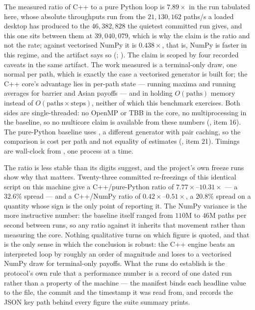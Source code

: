 \documentclass[11pt,a4paper]{article}
\begin{document}
The measured ratio of C++ to a pure Python loop is $7.89\times$ in the run tabulated
here, whose absolute throughputs run from the $21{,}130{,}162$ paths/s a loaded desktop has
produced to the $46{,}382{,}828$ the quietest committed run gives, and this one sits between them at
$39{,}040{,}079$, which is why the claim is the ratio and not the rate; against vectorised NumPy it
is $0.438\times$, that is, NumPy is faster in this regime, and the artifact says
so (;
). The claim is scoped by four recorded caveats in
the same artifact. The work measured is a terminal-only draw, one normal per path, which is exactly
the case a vectorised generator is built for; the C++ core's advantage lies in per-path state ---
running maxima and running averages for barrier and Asian payoffs --- and in holding
$O(\text{paths})$ memory instead of $O(\text{paths} \times \text{steps})$, neither of which this
benchmark exercises. Both sides are single-threaded: no OpenMP or TBB in the core, no
multiprocessing in the baseline, so no multicore claim is available from these numbers
(, item 16). The pure-Python baseline uses
, a different generator with pair caching, so the comparison is
cost per path and not equality of estimates (, item 21). Timings are
wall-clock from , one process at a time.

The ratio is less stable than its digits suggest, and the project's own freeze runs show why
that matters. Twenty-three committed re-freezings of this identical script on this machine give a
C++/pure-Python ratio of $7.77\times$--$10.31\times$ --- a $32.6\%$ spread --- and a C++/NumPy
ratio of $0.42\times$--$0.51\times$, a $20.8\%$ spread on a quantity whose sign is the only point of
reporting it. The NumPy variance is the more instructive number: the baseline itself ranged from
$110$M to $46$M paths per second between runs, so any ratio against it
inherits that movement rather than measuring the core. Nothing qualitative turns on which figure
is quoted, and that is the only sense in which the conclusion is robust: the C++ engine beats an
interpreted loop by roughly an order of magnitude and loses to a vectorised NumPy draw for
terminal-only payoffs. What the runs do establish is the protocol's own rule that a performance
number is a record of one dated run rather than a property of the machine --- the manifest binds
each headline value to the file, the commit and the timestamp it was read from, and
 records the JSON key path behind every figure
the suite summary prints.
\end{document}
